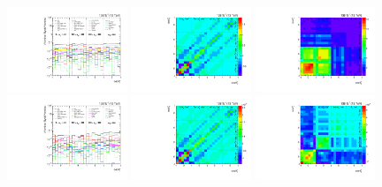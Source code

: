 \begin{figure}[htb]
\begin{center}
 \includegraphics[width=0.32\textwidth]{fig_fullRun2UL/unfolding/combined/deltaSystCombinedlog_rebinnedB_b1n_mttbar.pdf}
 \includegraphics[width=0.32\textwidth]{fig_fullRun2UL/unfolding/combined/StatCovMatrix_rebinnedB_b1n_mttbar.pdf}
 \includegraphics[width=0.32\textwidth]{fig_fullRun2UL/unfolding/combined/TotalSystCovMatrix_rebinnedB_b1n_mttbar.pdf} \\
 \includegraphics[width=0.32\textwidth]{fig_fullRun2UL/unfolding/combined/deltaSystCombinedlogNorm_rebinnedB_b1n_mttbar.pdf}
 \includegraphics[width=0.32\textwidth]{fig_fullRun2UL/unfolding/combined/StatCovMatrixNorm_rebinnedB_b1n_mttbar.pdf}
 \includegraphics[width=0.32\textwidth]{fig_fullRun2UL/unfolding/combined/TotalSystCovMatrixNorm_rebinnedB_b1n_mttbar.pdf} \\

\end{center}
\end{figure}
